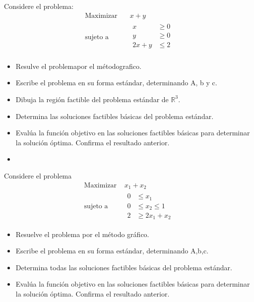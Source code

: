 \documentclass{article}
\begin{document}
Considere el problema:
\begin{equation*}
  \begin{aligned}
    \text{Maximizar} &\quad x+y \\
    \text{sujeto a} & \quad
    \begin{aligned}
      x & \geq 0\\
      y & \geq 0\\
      2x+y & \leq 2\\
    \end{aligned}
  \end{aligned}
\end{equation*}
\begin{itemize}
\item Resulve el problemapor el métodografico.
\item Escribe el problema en su forma estándar, determinando A, b y c.
\item Dibuja la región factible del problema estándar de $\mathbb{R}^{3}.$
\item Determina las soluciones factibles básicas del problema estándar.
\item Evalúa la función objetivo en las soluciones factibles básicas para determinar la solución óptima. Confirma el resultado anterior.
  \item 
\end{itemize}
Considere el problema
\begin{equation*}
  \begin{aligned}
    \text{Maximizar } & x_1+x_2\\
    \text{sujeto a } &
    \begin{aligned}
      0 &\leq x_1\\
      0 &\leq x_2\leq 1\\
      2 &\geq 2x_1+x_2
    \end{aligned}
  \end{aligned}
\end{equation*}
\begin{itemize}
\item Resuelve el problema por el método gráfico.
\item Escribe el problema en su forma estándar, determinando A,b,c.
\item Determina todas las soluciones factibles básicas del problema estándar.
\item Evalúa la función objetivo en las soluciones factibles básicas para determinar la solución óptima. Confirma el resultado anterior.
\end{itemize}
\end{document}
